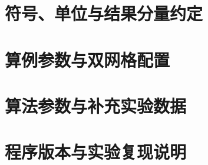 \cleardoublepage
{
    \appendixsecmajornumbering

    \section{符号、单位与结果分量约定}
    \thesisdraftnote

    \section{算例参数与双网格配置}
    \thesisdraftnote

    \section{算法参数与补充实验数据}
    \thesisdraftnote

    \section{程序版本与实验复现说明}
    \thesisdraftnote

    \removeappendixsecmajornumbering
}
